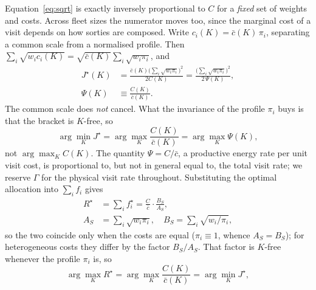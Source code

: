 \documentclass[journal,outdir=./]{IEEEtran}
\newcommand{\Gam}{\Gamma}
\newcommand{\Psicap}{\Psi}
\begin{document}
Equation~\eqref{eq:sqrt} is exactly inversely proportional to $C$ for a \emph{fixed} set of weights and costs. Across fleet sizes the numerator moves too, since the marginal cost of a visit depends on how sorties are composed. Write $c_i(K)=\bar c(K)\,\pi_i$, separating a common scale from a normalised profile. Then $\sum_i\sqrt{w_ic_i(K)}=\sqrt{\bar c(K)}\sum_i\sqrt{w_i\pi_i}$, and
\begin{equation}\label{eq:JstarGamma}
\begin{aligned}
J^{\star}(K)&=\frac{\bar c(K)\big(\sum_i\sqrt{w_i\pi_i}\big)^2}{2C(K)}=\frac{\big(\sum_i\sqrt{w_i\pi_i}\big)^2}{2\,\Psicap(K)},\\
\Psicap(K)&\equiv\frac{C(K)}{\bar c(K)}.
\end{aligned}
\end{equation}
The common scale does \emph{not} cancel. What the invariance of the profile $\pi_i$ buys is that the bracket is $K$-free, so
\[
\arg\min_KJ^{\star}=\arg\max_K\frac{C(K)}{\bar c(K)}=\arg\max_K\Psicap(K),
\]
not $\arg\max_KC(K)$. The quantity $\Psicap=C/\bar c$, a productive energy rate per unit visit cost, is proportional to, but not in general equal to, the total visit rate; we reserve $\Gam$ for the physical visit rate throughout. Substituting the optimal allocation into $\sum_if_i$ gives
\begin{equation}\label{eq:Rstar}
\begin{aligned}
R^{\star}&=\sum_i f_i^{\star}=\frac{C}{\bar c}\cdot\frac{B_S}{A_S},\\
A_S&=\sum_i\sqrt{w_i\pi_i},\quad B_S=\sum_i\sqrt{w_i/\pi_i},
\end{aligned}
\end{equation}
so the two coincide only when the costs are equal ($\pi_i\equiv1$, whence $A_S=B_S$); for heterogeneous costs they differ by the factor $B_S/A_S$. That factor is $K$-free whenever the profile $\pi_i$ is, so
\[
\arg\max_KR^{\star}=\arg\max_K\frac{C(K)}{\bar c(K)}=\arg\min_KJ^{\star},
\]
\end{document}
